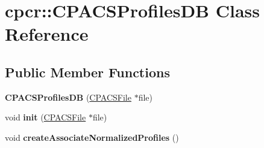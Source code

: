 \hypertarget{classcpcr_1_1CPACSProfilesDB}{\section{cpcr\-:\-:C\-P\-A\-C\-S\-Profiles\-D\-B Class Reference}
\label{classcpcr_1_1CPACSProfilesDB}
}
\subsection*{Public Member Functions}
\begin{DoxyCompactItemize}
\item 
\hypertarget{classcpcr_1_1CPACSProfilesDB_a85dadce1c7830ea425866b208e135243}{{\bfseries C\-P\-A\-C\-S\-Profiles\-D\-B} (\hyperlink{classcpcr_1_1CPACSFile}{C\-P\-A\-C\-S\-File} $\ast$file)}\label{classcpcr_1_1CPACSProfilesDB_a85dadce1c7830ea425866b208e135243}

\item 
\hypertarget{classcpcr_1_1CPACSProfilesDB_a24a1be06390823088aae0abeb86ae31c}{void {\bfseries init} (\hyperlink{classcpcr_1_1CPACSFile}{C\-P\-A\-C\-S\-File} $\ast$file)}\label{classcpcr_1_1CPACSProfilesDB_a24a1be06390823088aae0abeb86ae31c}

\item 
\hypertarget{classcpcr_1_1CPACSProfilesDB_a860f669b3928e544908c05ee1fd08f14}{void {\bfseries create\-Associate\-Normalized\-Profiles} ()}\label{classcpcr_1_1CPACSProfilesDB_a860f669b3928e544908c05ee1fd08f14}

\end{DoxyCompactItemize}
